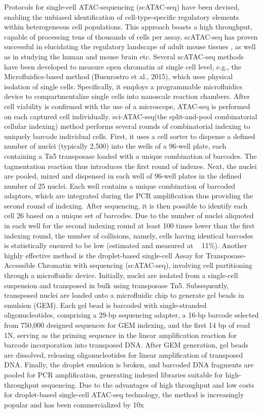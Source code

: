 Protocols for single-cell ATAC-sequencing (scATAC-seq) have been devised, enabling the unbiased identification of cell-type-specific regulatory elements within heterogeneous cell populations. This approach boasts a high throughput, capable of processing tens of thousands of cells per assay. scATAC-seq has proven successful in elucidating the regulatory landscape of adult mouse tissues \citep{cusanovich2018single}, as well as in studying the human and mouse brain \cite{lake2018humanbrain, sinnamon2019accessible} etc. Several scATAC-seq methods have been developed to measure open chromatin at single cell level, e.g., the Microfluidics-based method (Buenrostro et al., 2015), which uses physical isolation of single cells. Specifically, it employs a programmable microfluidics device to compartmentalize single cells into nanoscale reaction chambers. After cell viability is confirmed with the use of a microscope, ATAC-seq is performed on each captured cell individually. sci-ATAC-seq(the split-and-pool combinatorial cellular indexing) method \citep{cusanovich2015multiplex} performs several rounds of combinatorial indexing to uniquely barcode individual cells. First, it uses a cell sorter to dispense a defined number of nuclei (typically 2,500) into the wells of a 96-well plate, each containing a Tn5 transposase loaded with a unique combination of barcodes. The tagmentation reaction thus introduces the first round of indexes. Next, the nuclei are pooled, mixed and dispensed in each well of 96-well plates in the defined number of 25 nuclei. Each well contains a unique combination of barcoded adaptors, which are integrated during the PCR amplification thus providing the second round of indexing. After sequencing, it is then possible to identify each cell 26 based on a unique set of barcodes. Due to the number of nuclei aliquoted in each well for the second indexing round at least 100 times lower than the first indexing round, the number of collisions, namely, cells having identical barcodes is statistically ensured to be low (estimated and measured at ~ 11\%). Another highly effective method is the droplet-based single-cell Assay for Transposase-Accessible Chromatin with sequencing (scATAC-seq)\citep{satpathy2019massively}, involving cell partitioning through a microfluidic device. Initially, nuclei are isolated from a single-cell suspension and transposed in bulk using transposase Tn5. Subsequently, transposed nuclei are loaded onto a microfluidic chip to generate gel beads in emulsion (GEM). Each gel bead is barcoded with single-stranded oligonucleotides, comprising a 29-bp sequencing adapter, a 16-bp barcode selected from 750,000 designed sequences for GEM indexing, and the first 14 bp of read 1N, serving as the priming sequence in the linear amplification reaction for barcode incorporation into transposed DNA. After GEM generation, gel beads are dissolved, releasing oligonucleotides for linear amplification of transposed DNA. Finally, the droplet emulsion is broken, and barcoded DNA fragments are pooled for PCR amplification, generating indexed libraries suitable for high-throughput sequencing. Due to the advantages of high throughput and low costs for droplet-based single-cell ATAC-seq technology, the method is increasingly popular and has been commercialized by 10x 